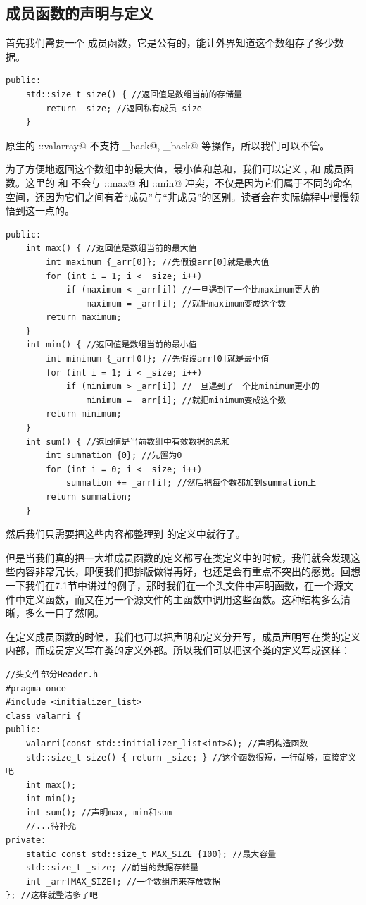 \subsection*{成员函数的声明与定义}
首先我们需要一个 \lstinline@size@ 成员函数，它是公有的，能让外界知道这个数组存了多少数据。
\begin{lstlisting}
public:
    std::size_t size() { //返回值是数组当前的存储量
        return _size; //返回私有成员_size
    }
\end{lstlisting}\par
原生的 \lstinline@std::valarray@ 不支持 \lstinline@push_back@, \lstinline@pop_back@ 等操作，所以我们可以不管。\par
为了方便地返回这个数组中的最大值，最小值和总和，我们可以定义 \lstinline@max@, \lstinline@min@ 和 \lstinline@sum@ 成员函数。这里的 \lstinline@max@ 和 \lstinline@min@ 不会与 \lstinline@std::max@ 和 \lstinline@std::min@ 冲突，不仅是因为它们属于不同的命名空间，还因为它们之间有着``成员''与``非成员''的区别。读者会在实际编程中慢慢领悟到这一点的。
\begin{lstlisting}
public:
    int max() { //返回值是数组当前的最大值
        int maximum {_arr[0]}; //先假设arr[0]就是最大值
        for (int i = 1; i < _size; i++)
            if (maximum < _arr[i]) //一旦遇到了一个比maximum更大的
                maximum = _arr[i]; //就把maximum变成这个数
        return maximum;
    }
    int min() { //返回值是数组当前的最小值
        int minimum {_arr[0]}; //先假设arr[0]就是最小值
        for (int i = 1; i < _size; i++)
            if (minimum > _arr[i]) //一旦遇到了一个比minimum更小的
                minimum = _arr[i]; //就把minimum变成这个数
        return minimum;
    }
    int sum() { //返回值是当前数组中有效数据的总和
        int summation {0}; //先置为0
        for (int i = 0; i < _size; i++)
            summation += _arr[i]; //然后把每个数都加到summation上
        return summation;
    }
\end{lstlisting}
然后我们只需要把这些内容都整理到 \lstinline@valarri@ 的定义中就行了。\par
但是当我们真的把一大堆成员函数的定义都写在类定义中的时候，我们就会发现这些内容非常冗长，即便我们把排版做得再好，也还是会有重点不突出的感觉。回想一下我们在7.1节中讲过的例子，那时我们在一个头文件中声明函数，在一个源文件中定义函数，而又在另一个源文件的主函数中调用这些函数。这种结构多么清晰，多么一目了然啊。\par
在定义成员函数的时候，我们也可以把声明和定义分开写，成员声明写在类的定义内部，而成员定义写在类的定义外部。所以我们可以把这个类的定义写成这样：
\begin{lstlisting}
//头文件部分Header.h
#pragma once
#include <initializer_list>
class valarri {
public:
    valarri(const std::initializer_list<int>&); //声明构造函数
    std::size_t size() { return _size; } //这个函数很短，一行就够，直接定义吧
    int max();
    int min();
    int sum(); //声明max, min和sum
    //...待补充
private:
    static const std::size_t MAX_SIZE {100}; //最大容量
    std::size_t _size; //前当的数据存储量
    int _arr[MAX_SIZE]; //一个数组用来存放数据
}; //这样就整洁多了吧
\end{lstlisting}
